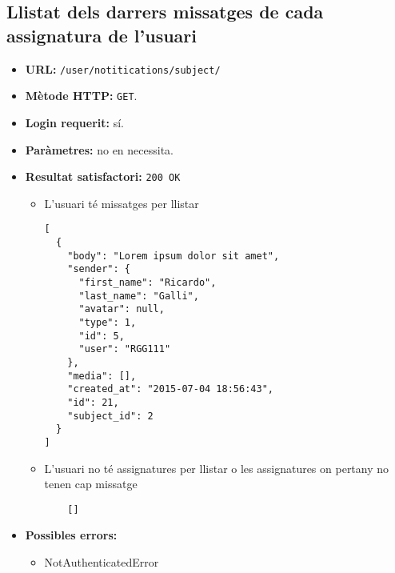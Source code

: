 \subsection{Llistat dels darrers missatges de cada assignatura de l'usuari}
\begin{itemize}
\item \textbf{\ac{URL}:} \texttt{/user/notitications/subject/}
\item \textbf{Mètode \ac{HTTP}: } \texttt{GET}.
\item \textbf{Login requerit:} sí.
\item \textbf{Paràmetres:} no en necessita.

\item \textbf{Resultat satisfactori:} \texttt{200 OK}
	\begin{itemize}
		\item L'usuari té missatges per llistar
	\begin{verbatim}
[
  {
    "body": "Lorem ipsum dolor sit amet",
    "sender": {
      "first_name": "Ricardo",
      "last_name": "Galli",
      "avatar": null,
      "type": 1,
      "id": 5,
      "user": "RGG111"
    },
    "media": [],
    "created_at": "2015-07-04 18:56:43",
    "id": 21,
    "subject_id": 2
  }
]
	\end{verbatim}
	
	\item L'usuari no té assignatures per llistar o les assignatures on pertany no tenen cap missatge
	
	\begin{verbatim}
	[]
	\end{verbatim}
	\end{itemize}


\item \textbf{Possibles errors:}
	\begin{itemize}
		\item NotAuthenticatedError
	\end{itemize}
\end{itemize}

